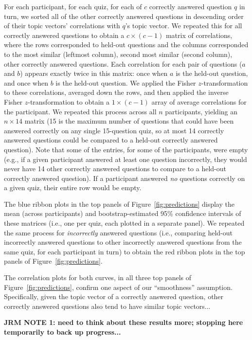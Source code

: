 \documentclass[10pt]{article}
\begin{document}
For each participant, for each quiz, for each of $c$ correctly answered
question $q$ in turn, we sorted all of the other correctly answered questions
in descending order of their topic vectors' correlations with $q$'s topic
vector. We repeated this for all correctly answered questions to obtain a $c
\times (c - 1)$ matrix of correlations, where the rows corresponded to held-out
questions and the columns corresponded to the most similar (leftmost column),
second most similar (second column), other correctly answered questions. Each
correlation for each pair of questions ($a$ and $b$) appears exactly twice in
this matrix: once when $a$ is the held-out question, and once when $b$ is the
held-out question. We applied the Fisher $z$-transformation to these
correlations, averaged down the rows, and then applied the inverse Fisher
$z$-transformation to obtain a $1 \times (c - 1)$ array of average correlations
for the participant. We repeated this process across all $n$ participants,
yielding an $n \times 14$ matrix (15 is the maximum number of questions that
could have been answered correctly on any single 15-question quiz, so at most
14 correctly answered questions could be compared to a held-out correctly
answered question). Note that some of the entries, for some of the
participants, were empty (e.g., if a given participant answered at least one
question incorrectly, they would never have 14 other correctly answered
questions to compare to a held-out correctly answered question). If a
participant answered \textit{no} questions correctly on a given quiz, their
entire row would be empty.

The blue ribbon plots in the top panels of Figure~\ref{fig:predictions} display
the mean (across participants) and bootstrap-estimated 95\% confidence
intervals of these matrices (i.e., one per quiz, each plotted in a separate
panel). We repeated the same process for \textit{incorrectly} answered
questions (i.e., comparing held-out incorrectly answered questions to other
incorrectly answered questions from the same quiz, for each participant in
turn) to obtain the red ribbon plots in the top panels of
Figure~\ref{fig:predictions}.

The correlation plots for both curves, in all three top panels of
Figure~\ref{fig:predictions}, confirm one aspect of our ``smoothness''
assumption. Specifically, given the topic vector of a correctly answered
question, other correctly answered questions also tend to have similar topic
vectors...

\textbf{JRM NOTE 1: need to think about these results more; stopping here
temporarily to back up progress...}
\end{document}
